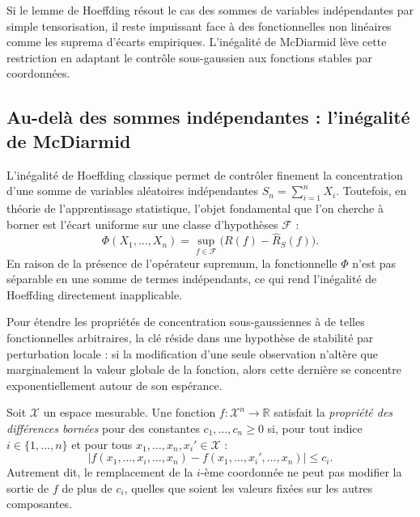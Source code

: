 Si le lemme de Hoeffding résout le cas des sommes de variables indépendantes par simple tensorisation, il reste impuissant face à des fonctionnelles non linéaires comme les suprema d'écarts empiriques. L'inégalité de McDiarmid lève cette restriction en adaptant le contrôle sous-gaussien aux fonctions stables par coordonnées.

\subsection{Au-delà des sommes indépendantes : l'inégalité de McDiarmid}

L'inégalité de Hoeffding classique permet de contrôler finement la concentration d'une somme de variables aléatoires indépendantes $S_n = \sum_{i=1}^n X_i$. Toutefois, en théorie de l'apprentissage statistique, l'objet fondamental que l'on cherche à borner est l'écart uniforme sur une classe d'hypothèses $\mathcal{F}$ :
\begin{equation}
    \Phi(X_1, \dots, X_n) = \sup_{f \in \mathcal{F}} \big( R(f) - \hat{R}_S(f) \big).
\end{equation}
En raison de la présence de l'opérateur supremum, la fonctionnelle $\Phi$ n'est pas séparable en une somme de termes indépendants, ce qui rend l'inégalité de Hoeffding directement inapplicable.

Pour étendre les propriétés de concentration sous-gaussiennes à de telles fonctionnelles arbitraires, la clé réside dans une hypothèse de stabilité par perturbation locale : si la modification d'une seule observation n'altère que marginalement la valeur globale de la fonction, alors cette dernière se concentre exponentiellement autour de son espérance.

\begin{definition}
Soit $\mathcal{X}$ un espace mesurable. Une fonction $f : \mathcal{X}^n \to \mathbb{R}$ satisfait la \emph{propriété des différences bornées} pour des constantes $c_1, \dots, c_n \geqslant 0$ si, pour tout indice $i \in \{1, \dots, n\}$ et pour tous $x_1, \dots, x_n, x_i' \in \mathcal{X}$ :
\begin{equation}
    |f(x_1, \dots, x_i, \dots, x_n) - f(x_1, \dots, x_i', \dots, x_n)| \leqslant c_i.
\end{equation}
Autrement dit, le remplacement de la $i$-ème coordonnée ne peut pas modifier la sortie de $f$ de plus de $c_i$, quelles que soient les valeurs fixées sur les autres composantes.
\end{definition}


